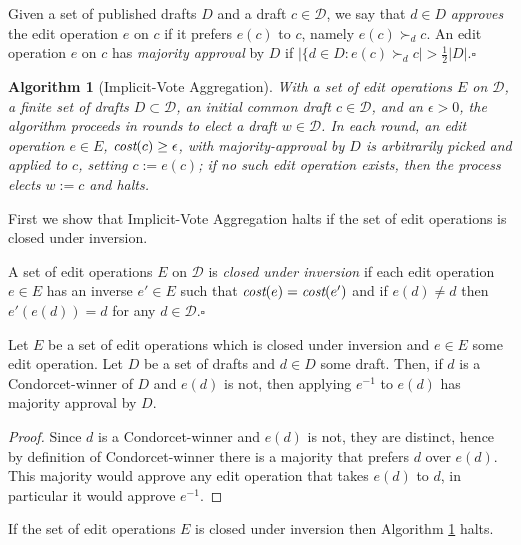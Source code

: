 \documentclass{llncs}
\newtheorem{algorithm}{Algorithm}
\newcommand{\qqed}{\hfill$\square$}
\newcommand{\calD}{\mathcal{D}}
\newcommand{\prefers}[1]{\succ_{#1}}
\newcommand{\cost}{\emph{cost}}
\begin{document}
\begin{definition}
%
Given a set of published drafts $D$ and a draft $c \in \calD$,  we say that $d \in D$ \emph{approves} the edit operation $e$ on $c$ if it prefers $e(c)$ to $c$, namely $e(c) \prefers{d} c$.  An edit operation $e$ on $c$ has \emph{majority approval} by $D$ if $|\{d \in D : e(c) \prefers{d} c| > \frac{1}{2}{|D|}$.\qqed 
%
\end{definition}

\begin{algorithm}[Implicit-Vote Aggregation]\label{algorithm:iva}
With a set of edit operations $E$ on $\calD$, a finite set of drafts $D \subset \calD$, an initial common draft $c \in \calD$,  and an $\epsilon > 0$, the algorithm proceeds in rounds to elect a draft $w \in \calD$.   In each round, an edit operation $e \in E$, $\cost(c) \ge \epsilon$,  with majority-approval by $D$ is arbitrarily picked and applied to $c$, setting $c := e(c)$;
if no such edit operation exists, then the process elects $w:=c$ and halts.
\end{algorithm}

First we show that Implicit-Vote Aggregation halts if the set of edit operations is closed under inversion.

\begin{definition}
%
A set of edit operations $E$ on $\calD$ is \emph{closed under inversion} if each edit operation $e \in E$ has an inverse $e' \in E$ such that $\cost(e)=\cost(e')$ and if $e(d) \ne d$ then $e'(e(d)) = d$ for any  $d \in \calD$.\qqed
%
\end{definition}


\begin{lemma}\label{lemma:inverse}
Let $E$ be a set of edit operations which is closed under inversion and $e \in E$ some edit operation.
Let $D$ be a set of drafts and 
$d \in D$ some draft.
Then,
if $d$ is a Condorcet-winner of $D$ and $e(d)$ is not,
then applying $e^{-1}$ to $e(d)$ has majority approval by $D$.
\end{lemma}

\begin{proof}
%
Since $d$ is a Condorcet-winner and $e(d)$ is not, they are distinct, hence by definition of Condorcet-winner there is a majority that prefers $d$ over $e(d)$.  This majority would approve any edit operation that takes $e(d)$ to $d$, in particular it would approve $e^{-1}$.
%
\end{proof}

\begin{lemma}\label{lemma:stops}
If the set of edit operations $E$ is closed under inversion then Algorithm \ref{algorithm:iva} halts.
\end{lemma}
\end{document}
